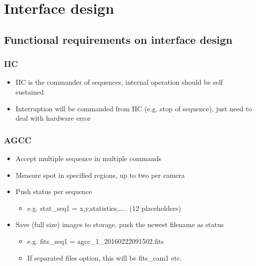 \documentclass[a4paper,notitlepage]{article}
\begin{document}
\section{Interface design}

\subsection{Functional requirements on interface design}

\subsubsection{IIC}
\begin{itemize}
  \item IIC is the commander of sequences, internal operation should be self sustained
  \item Interruption will be commanded from IIC (e.g. stop of sequence), just need to deal with hardware error
\end{itemize}

\subsubsection{AGCC}
\begin{itemize}
  \item Accept multiple sequence in multiple commands
  \item Measure spot in specified regions, up to two per camera
  \item Push status per sequence
  \begin{itemize}
    \item e.g. stat\_seq1 = x,y,statistics,….. (12 placeholders)
  \end{itemize}
  \item Save (full size) images to storage, push the newest filename as status
  \begin{itemize}
    \item e.g. fits\_seq1 = agcc\_1\_20160222091502.fits
    \item If separated files option, this will be fits\_cam1 etc.
  \end{itemize}
\end{itemize}
\end{document}
